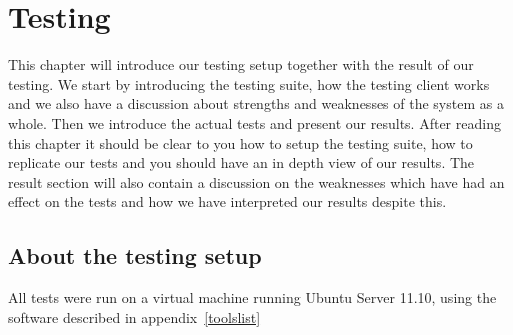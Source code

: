 \section{Testing}\label{Testing}
	This chapter will introduce our testing setup together with the result of our testing. We start by introducing the testing suite, how the testing client works and we also have a discussion about strengths and weaknesses of the system as a whole. Then we introduce the actual tests and present our results. After reading this chapter it should be clear to you how to setup the testing suite, how to replicate our tests and you should have an in depth view of our results. The result section will also contain a discussion on the weaknesses which have had an effect on the tests and how we have interpreted our results despite this.
	    
    \subsection{About the testing setup}\label{Testing:About}
        All tests were run on a virtual machine running Ubuntu Server 11.10, using the software described in appendix~\ref{toolslist}
    	
 		
    	
    	
	

    

